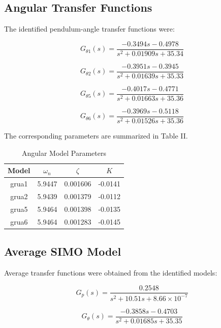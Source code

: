 \documentclass[journal,twocolumn]{IEEEtran}
\begin{document}
\subsection{Angular Transfer Functions}

The identified pendulum-angle transfer functions were:

\begin{equation}
G_{\theta1}(s)=
\frac{-0.3494s-0.4978}
{s^2+0.01909s+35.34}
\end{equation}

\begin{equation}
G_{\theta2}(s)=
\frac{-0.3951s-0.3945}
{s^2+0.01639s+35.33}
\end{equation}

\begin{equation}
G_{\theta5}(s)=
\frac{-0.4017s-0.4771}
{s^2+0.01663s+35.36}
\end{equation}

\begin{equation}
G_{\theta6}(s)=
\frac{-0.3969s-0.5118}
{s^2+0.01526s+35.36}
\end{equation}

The corresponding parameters are summarized in Table II.

\begin{table}[H]
\centering
\caption{Angular Model Parameters}
\begin{tabular}{cccc}
\toprule
Model & $\omega_n$ & $\zeta$ & $K$ \\
\midrule
grua1 & 5.9447 & 0.001606 & -0.0141 \\
grua2 & 5.9439 & 0.001379 & -0.0112 \\
grua5 & 5.9464 & 0.001398 & -0.0135 \\
grua6 & 5.9464 & 0.001283 & -0.0145 \\
\bottomrule
\end{tabular}
\label{tab:ang}
\end{table}

\subsection{Average SIMO Model}

Average transfer functions were obtained from the identified
models:

\begin{equation}
G_p(s)=
\frac{0.2548}{s^2+10.51s+8.66\times10^{-7}}
\end{equation}

\begin{equation}
G_\theta(s)=
\frac{-0.3858s-0.4703}
{s^2+0.01685s+35.35}
\end{equation}
\end{document}
